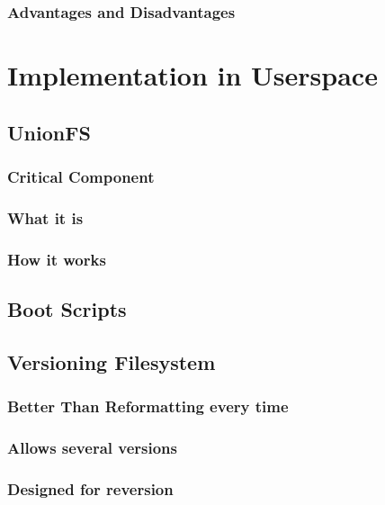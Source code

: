 \documentclass[11pt]{article}
\begin{document}
\subsubsection{Advantages and Disadvantages}

\section{Implementation in Userspace}
\subsection{UnionFS}
\subsubsection{Critical Component}
\subsubsection{What it is}
\subsubsection{How it works}
\subsection{Boot Scripts}
\subsection{Versioning Filesystem}
\subsubsection{Better Than Reformatting every time}
\subsubsection{Allows several versions}
\subsubsection{Designed for reversion}
\end{document}

